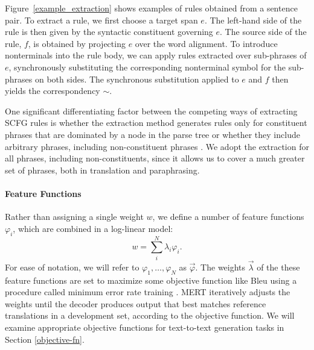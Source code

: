 \documentclass[11pt]{article}
\begin{document}
Figure~\ref{example_extraction} shows examples
of rules obtained from a sentence pair. To extract a rule, we first
choose a target span $e$. The left-hand side of the rule is then given
by the syntactic constituent governing $e$. 
The source side of the rule, $f$, is obtained by projecting $e$ over
the word alignment. To introduce nonterminals into the rule body, we
can apply rules extracted over sub-phrases of $e$, synchronously
substituting the corresponding nonterminal symbol for the sub-phrases
on both sides. The synchronous substitution applied to $e$ and $f$
then yields the correspondency $\sim$.

One significant differentiating factor between the competing ways of extracting SCFG rules is whether the extraction method generates rules only for constituent phrases that are dominated by a node in the parse tree \cite{Galley2004,cohn-lapata:2008} or whether they include arbitrary phrases, including non-constituent phrases \cite{Zollmann2006,Callison-Burch2008}. We adopt the extraction for all phrases, including non-constituents, since it allows us to cover a much greater set of phrases, both in translation and paraphrasing. 




\paragraph{Feature Functions}

Rather than assigning a single weight $w$, we define a number of feature
functions $\varphi_i$, which are combined in a log-linear model:
\begin{equation}
  w = \sum_i^N \lambda_i \varphi_i .
\end{equation}
For ease of notation, we will refer to $\varphi_1, \ldots ,\varphi_N$
as $\vec{\varphi}$. 
The weights $\vec{\lambda}$ of the these feature functions are set to maximize some objective function like Bleu \cite{Papineni2002} using a procedure called minimum error rate training \cite{Och2003c}.  MERT iteratively adjusts the weights until the decoder produces output that best matches reference translations in a development set, according to the objective function.  We will examine appropriate objective functions for text-to-text generation tasks in Section \ref{objective-fn}.
\end{document}
